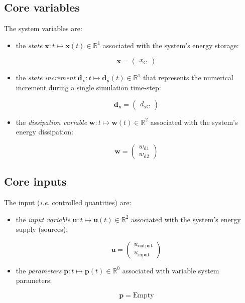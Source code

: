 \documentclass[11pt, oneside]{article}      %
\begin{document}
\subsection{Core variables}

The system variables are:


\begin{itemize}


\item the \emph{state} $\mathbf x: t\mapsto \mathbf x(t)\in \mathbb R ^{1}$ associated with the system's energy storage:


$$ \mathbf{x} = \left(\begin{array}{c}x_{\mathrm{C}}\end{array}\right)$$


\item the \emph{state increment} $\mathbf{d_x}: t\mapsto \mathbf{d_x}(t)\in \mathbb R ^{1}$ that represents the numerical increment during a single simulation time-step:


$$ \mathbf{d_x} = \left(\begin{array}{c}d_{\mathrm{xC}}\end{array}\right)$$


\item the \emph{dissipation variable} $\mathbf w: t\mapsto \mathbf w(t)\in \mathbb R^{2}$ associated with the system's energy dissipation:


$$ \mathbf{w} = \left(\begin{array}{c}w_{\mathrm{d1}}\\w_{\mathrm{d2}}\end{array}\right)$$


\end{itemize}



\subsection{Core inputs}

The input (\textit{i.e.} controlled quantities) are:


\begin{itemize}


\item the \emph{input variable} $\mathbf u: t\mapsto \mathbf u(t)\in \mathbb R^{2}$ associated with the system's energy supply (sources):


$$ \mathbf{u} = \left(\begin{array}{c}u_{\mathrm{output}}\\u_{\mathrm{input}}\end{array}\right)$$


\item the \emph{parameters} $\mathbf p: t\mapsto \mathbf p(t)\in \mathbb R^{0}$ associated with variable system parameters:


$$ \mathbf p = \mathrm{Empty}$$


\end{itemize}
\end{document}
